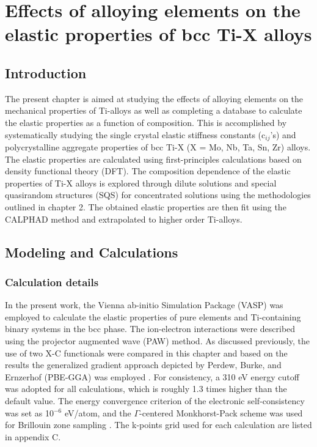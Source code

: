 \chapter{Effects of alloying elements on the elastic properties of bcc Ti-X alloys}

\section{Introduction}

The present chapter is aimed at studying the effects of alloying elements on the mechanical properties of Ti-alloys as well as completing a database to calculate the elastic properties as a function of composition. This is accomplished by systematically studying the single crystal elastic stiffness constants (c$_{ij}$'s) and polycrystalline aggregate properties of bcc Ti-X (X = Mo, Nb, Ta, Sn, Zr) alloys. The elastic properties are calculated using first-principles calculations based on density functional theory (DFT). The composition dependence of the elastic properties of Ti-X alloys is explored through dilute solutions and special quasirandom structures (SQS) \cite{Jiang2004} for concentrated solutions using the methodologies outlined in chapter 2. The obtained elastic properties are then fit using the CALPHAD method and extrapolated to higher order Ti-alloys. 

\section{Modeling and Calculations}

\subsection{Calculation details}
In the present work, the Vienna ab-initio Simulation Package (VASP) \cite{Kresse1996} was employed to calculate the elastic properties of pure elements and Ti-containing binary systems in the bcc phase. The ion-electron interactions were described using the projector augmented wave (PAW) \cite{Kresse1999,Blochl1994} method. As discussed previously, the use of two X-C functionals were compared in this chapter and based on the results the generalized gradient approach depicted by Perdew, Burke, and Ernzerhof (PBE-GGA) was employed \cite{Perdew1996a}. For consistency, a 310 eV energy cutoff was adopted for all calculations, which is roughly 1.3 times higher than the default value. The energy convergence criterion of the electronic self-consistency was set as 10$^{-6}$ eV/atom, and the $\Gamma$-centered Monkhorst-Pack scheme was used for Brillouin zone sampling \cite{Kresse1996,Monkhorst1976a}. The k-points grid used for each calculation are listed in appendix C.

